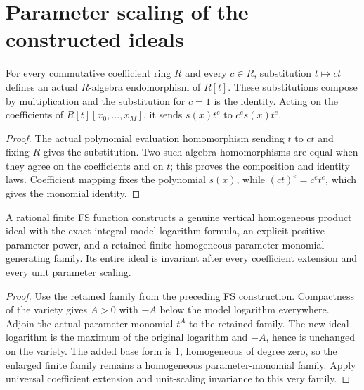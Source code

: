 \section{Parameter scaling of the constructed ideals}

\begin{lemma}
\label{lem:pl-parameter-scaling-hom}
\leanok
For every commutative coefficient ring $R$ and every $c\in R$, substitution
$t\mapsto ct$ defines an actual $R$-algebra endomorphism of $R[t]$.
These substitutions compose by multiplication and the substitution for
$c=1$ is the identity.  Acting on the coefficients of
$R[t][x_0,\ldots,x_M]$, it sends $s(x)t^e$ to $c^e s(x)t^e$.
\end{lemma}
\begin{proof}
The actual polynomial evaluation homomorphism sending $t$ to $ct$ and
fixing $R$ gives the substitution.  Two such algebra homomorphisms are
equal when they agree on the coefficients and on $t$; this proves the
composition and identity laws.  Coefficient mapping fixes the polynomial
$s(x)$, while $(ct)^e=c^et^e$, which gives the monomial identity.
\end{proof}

\begin{lemma}
\label{lem:pl-finite-fs-invariant-vertical-ideal}
\leanok
A rational finite FS function constructs a genuine vertical homogeneous
product ideal with the exact integral model-logarithm formula, an
explicit positive parameter power, and a retained finite homogeneous
parameter-monomial generating family.  Its entire ideal is invariant
after every coefficient extension and every unit parameter scaling.
\end{lemma}
\begin{proof}
Use the retained family from the preceding FS construction.  Compactness
of the variety gives $A>0$ with $-A$ below the model logarithm everywhere.
Adjoin the actual parameter monomial $t^A$ to the retained family.
The new ideal logarithm is the maximum of the original logarithm and
$-A$, hence is unchanged on the variety.  The added base form is $1$,
homogeneous of degree zero, so the enlarged finite family remains a
homogeneous parameter-monomial family.  Apply universal coefficient
extension and unit-scaling invariance to this very family.
\end{proof}

